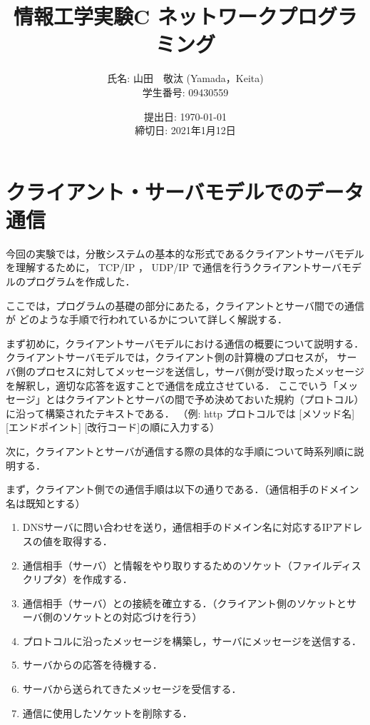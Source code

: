 \documentclass[11pt]{jsarticle}
\begin{document}
\title{情報工学実験C ネットワークプログラミング}
\author{
氏名: 山田　敬汰 (Yamada，Keita) \\
学生番号: 09430559
}
\date{提出日: \today \\   
      締切日: 2021年1月12日 \\}  
\maketitle

\section{クライアント・サーバモデルでのデータ通信}

今回の実験では，分散システムの基本的な形式であるクライアントサーバモデルを理解するために，
TCP/IP ， UDP/IP で通信を行うクライアントサーバモデルのプログラムを作成した．

ここでは，プログラムの基礎の部分にあたる，クライアントとサーバ間での通信が
どのような手順で行われているかについて詳しく解説する．

まず初めに，クライアントサーバモデルにおける通信の概要について説明する．クライアントサーバモデルでは，クライアント側の計算機のプロセスが，
サーバ側のプロセスに対してメッセージを送信し，サーバ側が受け取ったメッセージを解釈し，適切な応答を返すことで通信を成立させている．
ここでいう「メッセージ」とはクライアントとサーバの間で予め決めておいた規約（プロトコル）に沿って構築されたテキストである．
（例: http プロトコルでは [メソッド名] [エンドポイント] [改行コード]の順に入力する）

次に，クライアントとサーバが通信する際の具体的な手順について時系列順に説明する．

まず，クライアント側での通信手順は以下の通りである．（通信相手のドメイン名は既知とする）

\begin{enumerate}
      \item DNSサーバに問い合わせを送り，通信相手のドメイン名に対応するIPアドレスの値を取得する．
      \item 通信相手（サーバ）と情報をやり取りするためのソケット（ファイルディスクリプタ）を作成する．
      \item 通信相手（サーバ）との接続を確立する．（クライアント側のソケットとサーバ側のソケットとの対応づけを行う）
      \item プロトコルに沿ったメッセージを構築し，サーバにメッセージを送信する．
      \item サーバからの応答を待機する．
      \item サーバから送られてきたメッセージを受信する．
      \item 通信に使用したソケットを削除する．
\end{enumerate}
\end{document}
